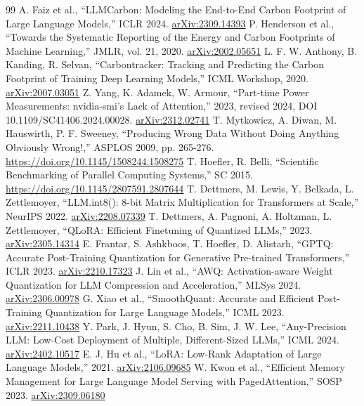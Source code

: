 \begin{thebibliography}{99}
 A. Faiz et al., ``LLMCarbon: Modeling the End-to-End Carbon Footprint of Large Language Models,'' ICLR 2024. \href{https://arxiv.org/abs/2309.14393}{arXiv:2309.14393}
 P. Henderson et al., ``Towards the Systematic Reporting of the Energy and Carbon Footprints of Machine Learning,'' JMLR, vol. 21, 2020. \href{https://arxiv.org/abs/2002.05651}{arXiv:2002.05651}
 L. F. W. Anthony, B. Kanding, R. Selvan, ``Carbontracker: Tracking and Predicting the Carbon Footprint of Training Deep Learning Models,'' ICML Workshop, 2020. \href{https://arxiv.org/abs/2007.03051}{arXiv:2007.03051}
 Z. Yang, K. Adamek, W. Armour, ``Part-time Power Measurements: nvidia-smi's Lack of Attention,'' 2023, revised 2024, DOI 10.1109/SC41406.2024.00028. \href{https://arxiv.org/abs/2312.02741}{arXiv:2312.02741}
 T. Mytkowicz, A. Diwan, M. Hauswirth, P. F. Sweeney, ``Producing Wrong Data Without Doing Anything Obviously Wrong!,'' ASPLOS 2009, pp. 265-276. \url{https://doi.org/10.1145/1508244.1508275}
 T. Hoefler, R. Belli, ``Scientific Benchmarking of Parallel Computing Systems,'' SC 2015. \url{https://doi.org/10.1145/2807591.2807644}
 T. Dettmers, M. Lewis, Y. Belkada, L. Zettlemoyer, ``LLM.int8(): 8-bit Matrix Multiplication for Transformers at Scale,'' NeurIPS 2022. \href{https://arxiv.org/abs/2208.07339}{arXiv:2208.07339}
 T. Dettmers, A. Pagnoni, A. Holtzman, L. Zettlemoyer, ``QLoRA: Efficient Finetuning of Quantized LLMs,'' 2023. \href{https://arxiv.org/abs/2305.14314}{arXiv:2305.14314}
 E. Frantar, S. Ashkboos, T. Hoefler, D. Alistarh, ``GPTQ: Accurate Post-Training Quantization for Generative Pre-trained Transformers,'' ICLR 2023. \href{https://arxiv.org/abs/2210.17323}{arXiv:2210.17323}
 J. Lin et al., ``AWQ: Activation-aware Weight Quantization for LLM Compression and Acceleration,'' MLSys 2024. \href{https://arxiv.org/abs/2306.00978}{arXiv:2306.00978}
 G. Xiao et al., ``SmoothQuant: Accurate and Efficient Post-Training Quantization for Large Language Models,'' ICML 2023. \href{https://arxiv.org/abs/2211.10438}{arXiv:2211.10438}
 Y. Park, J. Hyun, S. Cho, B. Sim, J. W. Lee, ``Any-Precision LLM: Low-Cost Deployment of Multiple, Different-Sized LLMs,'' ICML 2024. \href{https://arxiv.org/abs/2402.10517}{arXiv:2402.10517}
 E. J. Hu et al., ``LoRA: Low-Rank Adaptation of Large Language Models,'' 2021. \href{https://arxiv.org/abs/2106.09685}{arXiv:2106.09685}
 W. Kwon et al., ``Efficient Memory Management for Large Language Model Serving with PagedAttention,'' SOSP 2023. \href{https://arxiv.org/abs/2309.06180}{arXiv:2309.06180}

\end{thebibliography}
